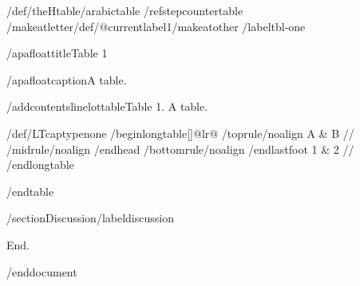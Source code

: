 /def/theHtable{/arabic{table}}%
/refstepcounter{table}%
/makeatletter/def/@currentlabel{1}/makeatother%
/label{tbl-one}

/apafloattitle{Table 1}

/apafloatcaption{A table.}

/addcontentsline{lot}{table}{Table 1. A table.}

{/def/LTcaptype{none} %
/begin{longtable}[]{@{}lr@{}}
/toprule/noalign{}
A & B //
/midrule/noalign{}
/endhead
/bottomrule/noalign{}
/endlastfoot
1 & 2 //
/end{longtable}
}

/end{table}

/section{Discussion}/label{discussion}

End.




/end{document}
